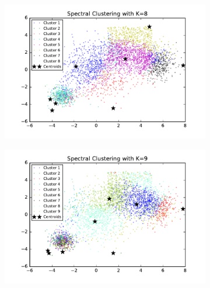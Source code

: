 \begin{figure}[htb]
\begin{subfigure}[b]{0.475\textwidth}
        \end{subfigure}
        \hfill
        \begin{subfigure}[b]{0.475\textwidth}  
            \centering 
            \includegraphics[width=\textwidth]{./figures/bigClustering_spectral_8.pdf}
        \end{subfigure}
        \begin{subfigure}[b]{0.475\textwidth}   
            \centering 
            \includegraphics[width=\textwidth]{./figures/bigClustering_spectral_9.pdf}
        \end{subfigure}
        \hfill
        \begin{subfigure}[b]{0.475\textwidth}   
            \centering 

\end{subfigure}
\end{figure}

